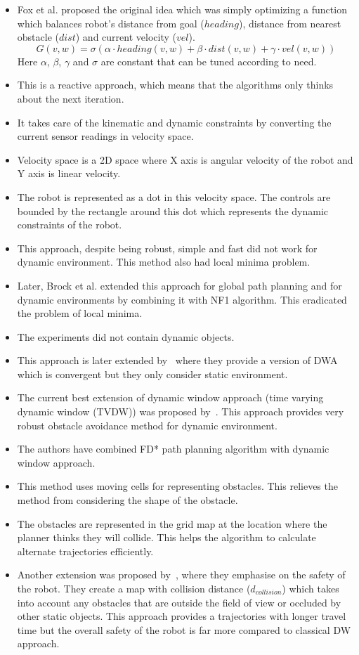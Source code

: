 \begin{itemize}
\item Fox et al.\cite{fox1997dynamic} proposed the original idea which was simply optimizing a function which balances robot's distance from goal ($heading$), distance from nearest obstacle ($dist$) and current velocity ($vel$).  $$ G(v,w)= \sigma(\alpha \cdot  heading(v,w) +\beta \cdot dist(v,w) + \gamma \cdot vel(v,w)) $$
    Here $\alpha$, $\beta$, $\gamma$ and $\sigma$ are constant that can be tuned according to need.
\item This is a reactive approach, which means that the algorithms only thinks about the next iteration.
\item It takes care of the kinematic and dynamic constraints by converting the current sensor readings in velocity space.
\item Velocity space is a 2D space where X axis is angular velocity of the robot and Y axis is linear velocity.
\item The robot is represented as a dot in this velocity space. The controls are bounded by the rectangle around this dot which represents the dynamic constraints of the robot.
\item This approach, despite being robust, simple and fast did not work for dynamic environment. This method also had local minima problem.
\item Later, Brock et al.\cite{brock1999high} extended this approach for global path planning and for dynamic environments by combining it with NF1 algorithm. This eradicated the problem of local minima. 
\item The experiments did not contain dynamic objects.
\item This approach is later extended by~\cite{ogren2005convergent} where they provide a version of DWA which is convergent but they only consider static environment.
\item The current best extension of dynamic window approach (time varying dynamic window (TVDW)) was proposed by~\cite{seder2007dynamic}. This approach provides very robust obstacle avoidance method for dynamic environment.
\item The authors have combined FD* path planning algorithm with dynamic window approach.
\item This method uses moving cells for representing obstacles. This relieves the method from considering the shape of the obstacle.
\item The obstacles are represented in the grid map at the location where the planner thinks they will collide. This helps the algorithm to calculate alternate trajectories efficiently.
\item Another extension was proposed by~\cite{chung2009safe}, where they emphasise on the safety of the robot. They create a map with collision distance ($d_{collision}$) which takes into account any obstacles that are outside the field of view or occluded by other static objects. This approach provides a trajectories with longer travel time but the overall safety of the robot is far more compared to classical DW approach.
\end{itemize}

